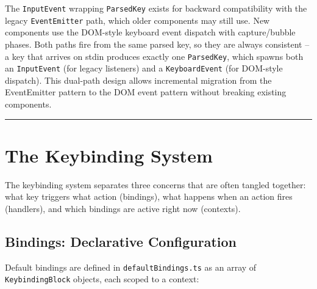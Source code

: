 \documentclass[
  english,
  11pt,
  letterpaper,
]{book}
\begin{document}
The \texttt{InputEvent} wrapping \texttt{ParsedKey} exists for backward
compatibility with the legacy \texttt{EventEmitter} path, which older
components may still use. New components use the DOM-style keyboard
event dispatch with capture/bubble phases. Both paths fire from the same
parsed key, so they are always consistent -- a key that arrives on stdin
produces exactly one \texttt{ParsedKey}, which spawns both an
\texttt{InputEvent} (for legacy listeners) and a \texttt{KeyboardEvent}
(for DOM-style dispatch). This dual-path design allows incremental
migration from the EventEmitter pattern to the DOM event pattern without
breaking existing components.

\begin{center}\rule{0.5\linewidth}{0.5pt}\end{center}

\section{The Keybinding System}\label{the-keybinding-system}

The keybinding system separates three concerns that are often tangled
together: what key triggers what action (bindings), what happens when an
action fires (handlers), and which bindings are active right now
(contexts).

\subsection{Bindings: Declarative
Configuration}\label{bindings-declarative-configuration}

Default bindings are defined in \texttt{defaultBindings.ts} as an array
of \texttt{KeybindingBlock} objects, each scoped to a context:
\end{document}
